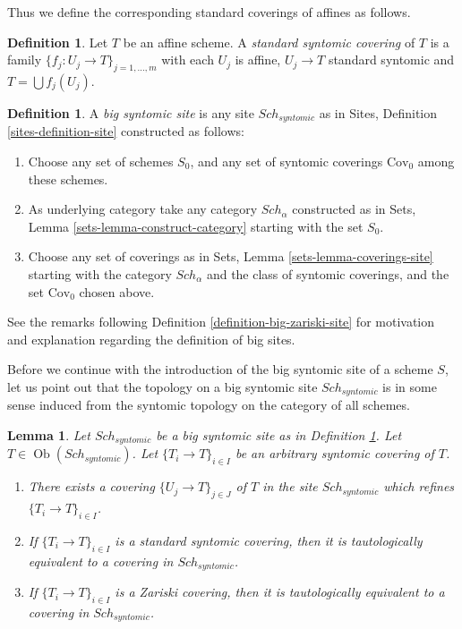 \documentclass{stacks-project}
\theoremstyle{plain}
\newtheorem{lemma}[subsection]{Lemma}
\theoremstyle{definition}
\newtheorem{definition}[subsection]{Definition}
\theoremstyle{remark}
\numberwithin{equation}{subsection}
\def\Sch{\mathit{Sch}}
\def\Ob{\mathop{\mathrm{Ob}}\nolimits}
\begin{document}
\noindent
Thus we define the corresponding standard coverings of affines as follows.

\begin{definition}
\label{definition-standard-syntomic}
Let $T$ be an affine scheme. A {\it standard syntomic covering} of $T$ is
a family $\{f_j : U_j \to T\}_{j = 1, \ldots, m}$ with each $U_j$ is
affine, $U_j \to T$ standard syntomic and $T = \bigcup f_j(U_j)$.
\end{definition}

\begin{definition}
\label{definition-big-syntomic-site}
A {\it big syntomic site} is any site $\Sch_{syntomic}$ as in
Sites, Definition \ref{sites-definition-site} constructed as follows:
\begin{enumerate}
\item Choose any set of schemes $S_0$, and any set of syntomic coverings
$\text{Cov}_0$ among these schemes.
\item As underlying category take any category $\Sch_\alpha$
constructed as in Sets, Lemma \ref{sets-lemma-construct-category}
starting with the set $S_0$.
\item Choose any set of coverings as in
Sets, Lemma \ref{sets-lemma-coverings-site} starting with the
category $\Sch_\alpha$ and the class of syntomic coverings,
and the set $\text{Cov}_0$ chosen above.
\end{enumerate}
\end{definition}

\noindent
See the remarks following Definition \ref{definition-big-zariski-site}
for motivation and explanation regarding the definition of big sites.

\medskip\noindent
Before we continue with the introduction of the big syntomic site of
a scheme $S$, let us point out that the topology on a big syntomic site
$\Sch_{syntomic}$ is in some sense induced from the syntomic topology
on the category of all schemes.

\begin{lemma}
\label{lemma-syntomic-induced}
Let $\Sch_{syntomic}$ be a big syntomic site as in
Definition \ref{definition-big-syntomic-site}.
Let $T \in \Ob(\Sch_{syntomic})$.
Let $\{T_i \to T\}_{i \in I}$ be an arbitrary syntomic covering of $T$.
\begin{enumerate}
\item There exists a covering $\{U_j \to T\}_{j \in J}$ of $T$ in the site
$\Sch_{syntomic}$ which refines $\{T_i \to T\}_{i \in I}$.
\item If $\{T_i \to T\}_{i \in I}$ is a standard syntomic covering, then
it is tautologically equivalent to a covering in $\Sch_{syntomic}$.
\item If $\{T_i \to T\}_{i \in I}$ is a Zariski covering, then
it is tautologically equivalent to a covering in $\Sch_{syntomic}$.
\end{enumerate}
\end{lemma}
\end{document}
